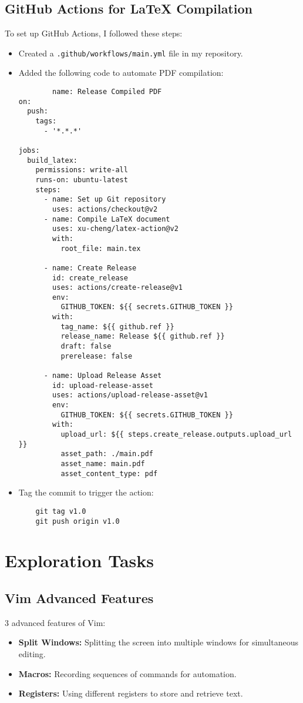 \documentclass{article}
\begin{document}
\subsection{GitHub Actions for LaTeX Compilation}  
To set up GitHub Actions, I followed these steps:  
\begin{itemize}  
    \item Created a \texttt{.github/workflows/main.yml} file in my repository.  
    \item Added the following code to automate PDF compilation:  
    \begin{verbatim}  
        name: Release Compiled PDF 
on:
  push:
    tags:
      - '*.*.*'

jobs:
  build_latex:
    permissions: write-all
    runs-on: ubuntu-latest
    steps:
      - name: Set up Git repository
        uses: actions/checkout@v2
      - name: Compile LaTeX document
        uses: xu-cheng/latex-action@v2
        with:
          root_file: main.tex

      - name: Create Release
        id: create_release
        uses: actions/create-release@v1
        env:
          GITHUB_TOKEN: ${{ secrets.GITHUB_TOKEN }}
        with:
          tag_name: ${{ github.ref }}
          release_name: Release ${{ github.ref }}
          draft: false
          prerelease: false

      - name: Upload Release Asset
        id: upload-release-asset 
        uses: actions/upload-release-asset@v1
        env:
          GITHUB_TOKEN: ${{ secrets.GITHUB_TOKEN }}
        with:
          upload_url: ${{ steps.create_release.outputs.upload_url }} 
          asset_path: ./main.pdf
          asset_name: main.pdf
          asset_content_type: pdf
    \end{verbatim}  
    \item Tag the commit to trigger the action:  
    \begin{verbatim}  
    git tag v1.0  
    git push origin v1.0  
    \end{verbatim}  
\end{itemize}     
\section{Exploration Tasks}
\subsection{Vim Advanced Features} 
3 advanced features of Vim: 
\begin{itemize}  
    \item \textbf{Split Windows:} Splitting the screen into multiple windows for simultaneous editing.  
    \item \textbf{Macros:} Recording sequences of commands for automation.  
    \item \textbf{Registers:} Using different registers to store and retrieve text.  
\end{itemize}
\end{document}
